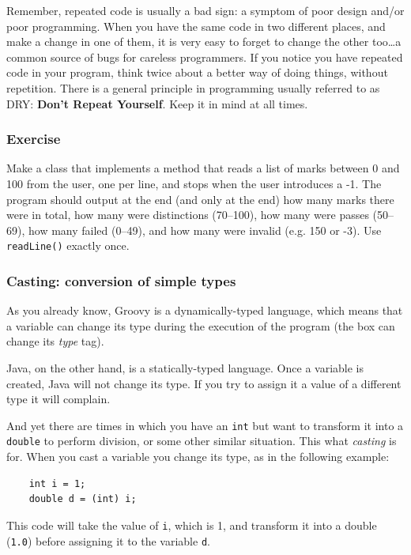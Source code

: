 Remember, repeated code is usually a bad sign: a symptom of poor
design and/or poor programming. When you have the same code in two
different places, and make a change in one of them, it is very easy to
forget to change the other too\ldots a common source of bugs for
careless programmers. If you notice you have repeated code in your
program, think twice about a better way of doing things, without
repetition. There is a general principle in programming usually
referred to as DRY: \textbf{Don't Repeat Yourself}. Keep it in mind at
all times.


\subsubsection*{Exercise}

Make a class that implements a method 
that reads a list of marks between 0 and 100 from the
user, one per line, and stops when the user introduces a -1. The
program should output at the end (and only at the end) how many marks
there were in total, how many were distinctions (70--100), how many
were passes (50--69), how many failed (0--49), and how many were
invalid (e.g. 150 or -3). Use \texttt{readLine()} exactly once.

\subsubsection{Casting: conversion of simple types}
\label{sec:cast-conv-simple}

As you already know, Groovy is a dynamically-typed language, which
means that a variable can change its type during the execution of the
program (the box can change its \emph{type} tag). 

Java, on the other hand, is a statically-typed language. Once a
variable is created, Java will not change its type. If you try to
assign it a value of a different type it will complain.

And yet there are times in which you have an \verb+int+ but want to
transform it into a \verb+double+ to perform division, or some other
similar situation. This what \emph{casting} is for. When you cast a
variable you change its type, as in the following example: 

\begin{verbatim}
    int i = 1;
    double d = (int) i;
\end{verbatim}

This code will take the value of \verb+i+, which is 1, and transform
it into a double (\verb+1.0+) before assigning it to the
variable \verb+d+. 

